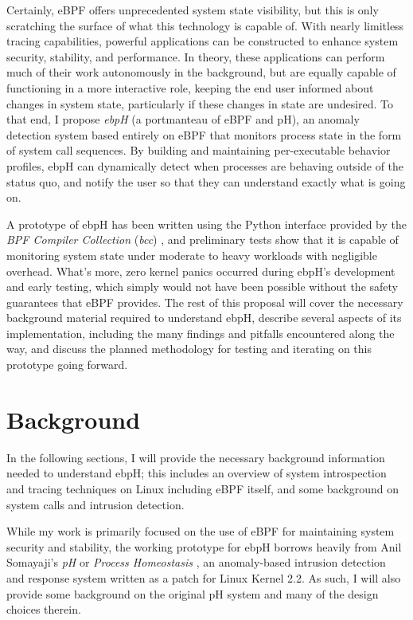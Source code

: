 \documentclass[
  12pt]{findlay}
\begin{document}
Certainly, eBPF offers unprecedented system state visibility, but this
is only scratching the surface of what this technology is capable of.
With nearly limitless tracing capabilities, powerful applications can be
constructed to enhance system security, stability, and performance. In
theory, these applications can perform much of their work autonomously
in the background, but are equally capable of functioning in a more
interactive role, keeping the end user informed about changes in system
state, particularly if these changes in state are undesired. To that
end, I propose \emph{ebpH} (a portmanteau of eBPF and pH), an anomaly
detection system based entirely on eBPF that monitors process state in
the form of system call sequences. By building and maintaining
per-executable behavior profiles, ebpH can dynamically detect when
processes are behaving outside of the status quo, and notify the user so
that they can understand exactly what is going on.

A prototype of ebpH has been written using the Python interface provided
by the \emph{BPF Compiler Collection} (\emph{bcc}) \autocite{bcc}, and
preliminary tests show that it is capable of monitoring system state
under moderate to heavy workloads with negligible overhead. What's more,
zero kernel panics occurred during ebpH's development and early testing,
which simply would not have been possible without the safety guarantees
that eBPF provides. The rest of this proposal will cover the necessary
background material required to understand ebpH, describe several
aspects of its implementation, including the many findings and pitfalls
encountered along the way, and discuss the planned methodology for
testing and iterating on this prototype going forward.

\hypertarget{background}{%
\section{Background}\label{background}}

In the following sections, I will provide the necessary background
information needed to understand ebpH; this includes an overview of
system introspection and tracing techniques on Linux including eBPF
itself, and some background on system calls and intrusion detection.

While my work is primarily focused on the use of eBPF for maintaining
system security and stability, the working prototype for ebpH borrows
heavily from Anil Somayaji's \emph{pH} or \emph{Process Homeostasis}
\autocite{soma02}, an anomaly-based intrusion detection and response
system written as a patch for Linux Kernel 2.2. As such, I will also
provide some background on the original pH system and many of the design
choices therein.
\end{document}
